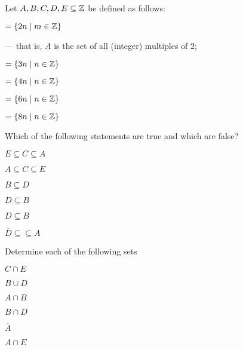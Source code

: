 \documentclass[a4paper, english, 12pt]{article} %
\begin{document}
\begin{problem}[4]
  Let $A, B, C, D, E \subseteq \mathbb{Z}$ be defined as follows:
  
  \begin{Tabbedenum}[label = \hspace{1cm}$\Alph*$]{2}
    \item \label{A} $= \{ 2n \mid m \in \mathbb{Z} \}$ 
    \item[] \hspace{-3cm} --- that is, $A$ is the set of all (integer) multiples of $2$;
    \item \label{B} $= \{ 3n \mid n \in \mathbb{Z} \}$ 
    \item \label{C} $= \{ 4n \mid n \in \mathbb{Z} \}$
    \item \label{D} $= \{ 6n \mid n \in \mathbb{Z} \}$
    \item \label{E} $= \{ 8n \mid n \in \mathbb{Z} \}$
  \end{Tabbedenum}
\end{problem}

\begin{subproblem}
  Which of the following statements are true and which are false?

  \begin{Tabbedenum}[label = \textbf{\roman*}), align=right]{2}
    \item $E \subseteq C \subseteq A$ 
    \item $A \subseteq C \subseteq E$ 
    \item $B \subseteq D $ 
    \item $D \subseteq B $ 
    \item $D \subseteq B $ 
    \item $\overline{D} \subseteq \subseteq{A}$ 
  \end{Tabbedenum}
\end{subproblem}

\begin{subproblem}
  Determine each of the following sets

  \begin{Tabbedenum}[label = \textbf{\roman*}), align=right]{3}
    \item $ C \cap E $ 
    \item $ B \cup D $ 
    \item $ A \cap B $ 
    \item $ B \cap D $ 
    \item $ \overline{A} $ 
    \item $ A \cap E $ 
  \end{Tabbedenum}

\end{subproblem}
\end{document}
